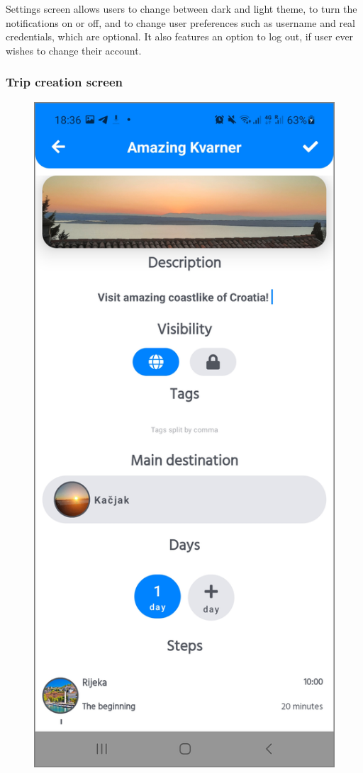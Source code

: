 Settings screen allows users to change between dark and light theme, to turn the notifications on or off, and to change user preferences such as username and real credentials, which are optional. It also features an option to log out, if user ever wishes to change their account. 
 
\newpage
\subsubsection{Trip creation screen}
\begin{figure}[!htb]
\centering
\begin{minipage}{.48\textwidth}
\centering
\includegraphics[width=.9\textwidth]{../Images/UI/TripCreateWhite.jpg}

\end{minipage}
\end{figure}
